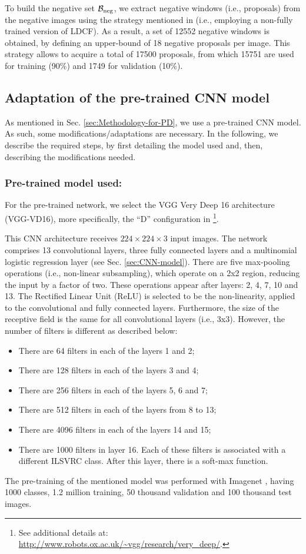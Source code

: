 \documentclass[5p,time]{elsarticle}
\begin{document}
To build the negative set ${\cal B}_{\rm neg}$, we extract negative
windows (i.e., proposals) from the negative images using the
strategy mentioned in \cite{RibeiroPR2016} (i.e., employing a
non-fully trained version of LDCF). As a result, a set of 12552
negative windows is obtained, by defining an upper-bound of 18
negative proposals per image. This strategy allows to acquire a
total of 17500 proposals, from which 15751 are used for training
(90$\%$) and 1749 for validation (10$\%$).

\subsection{Adaptation of the pre-trained CNN model}\label{sec:Adaptation of the CNN}
As mentioned in Sec. \ref{sec:Methodology-for-PD}, we use a pre-trained CNN model. As such, some modifications/adaptations are necessary. In the following, we describe the required steps, by first detailing the model used and, then, describing the modifications needed.

\subsubsection{Pre-trained model used:}
For the pre-trained network, we select the VGG Very Deep 16 architecture (VGG-VD16), more specifically, the  ``D'' configuration in \cite{SimonyanICLR2015}\footnote{See additional details at: \url{http://www.robots.ox.ac.uk/~vgg/research/very_deep/}.}.

This CNN architecture receives $224\times 224\times 3$ input images. The network comprises 13 convolutional layers, three fully connected layers and a multinomial logistic regression layer (see Sec. \ref{sec:CNN-model}). There are five max-pooling operations (i.e., non-linear subsampling), which operate on a 2x2 region, reducing the input by a factor of two. These operations appear after layers: 2, 4, 7, 10 and 13. The Rectified Linear Unit (ReLU) is selected to be the non-linearity, applied to the convolutional and fully connected layers. Furthermore, the size of the receptive field is the same for all convolutional layers (i.e., 3x3). However, the number of filters is different as described below:
\begin{itemize}
	\item{There are   64 filters in each of the layers 1 and 2;} 
	\item{There are  128 filters in each of the layers 3 and 4;} 
	\item{There are  256 filters in each of the layers 5, 6 and 7;} 
	\item{There are  512 filters in each of the layers from 8 to 13;} 
	\item{There are 4096 filters in each of the layers 14 and 15;} 
	\item{There are 1000 filters in layer 16. Each of these filters is associated with a different ILSVRC \cite{RussakovskyIJCV2015} class. After this layer, there is a soft-max function.} 
\end{itemize}
The pre-training of the mentioned model was performed with Imagenet \cite{RussakovskyIJCV2015}, having 1000 classes, 1.2 million training, 50 thousand validation and 100 thousand test images.
\end{document}
